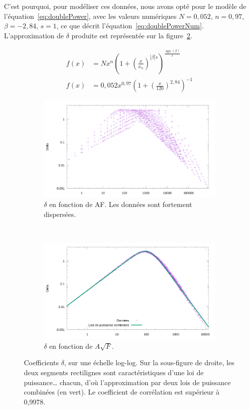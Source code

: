 	C'est pourquoi, pour modéliser ces données, nous avons opté pour le modèle de l'équation~\ref{eq:doublePower}, avec les valeurs numériques $N = 0,052$, $n = 0,97$, $\beta{} = -2,84$, $s = 1$,  ce que décrit l'équation~\ref{eq:doublePowerNum}. L'approximation de $\delta$ produite est représentée sur la figure~\ref{fig:a_rootF_delta}.
	
	\begin{align}
		\label{eq:doublePower}
		f(x) &= N x^n \left(1+\left(\frac{x}{x_n}\right)^{|\beta|s}\right)^{\frac{\operatorname{sgn}(\beta)}{s}} \\
		\label{eq:doublePowerNum}
		f(x) &= 0,052 x^{0,97} \left(1+\left(\frac{x}{120}\right)^{2,84}\right)^{-1}
	\end{align}
	

	\begin{figure}[!htb]
		\begin{subfigure}[t]{0.485\textwidth}
			\centering
			\includegraphics[width=\textwidth]{figures/ch4/af_delta}
			\caption{$\delta$ en fonction de AF. Les données sont fortement dispersées.}
			\label{fig:af_delta}
		\end{subfigure}
		~
		\begin{subfigure}[t]{0.485\textwidth}
			\centering
			\includegraphics[width=\textwidth]{figures/ch4/a_rootF_delta}
			\caption{$\delta$ en fonction de $A\sqrt{F}$.}
			\label{fig:a_rootF_delta}
		\end{subfigure}
		\caption[Coefficients $\delta$]{Coefficients $\delta$, sur une échelle log-log. Sur la sous-figure de droite, les deux segments rectilignes sont caractéristiques d'une loi de puissance\ldots{} chacun, d'où l'approximation par deux lois de puissance combinées (en vert). Le coefficient de corrélation est supérieur à 0,9978.}
		\label{fig:af_and_root_delta}
	\end{figure}
	
